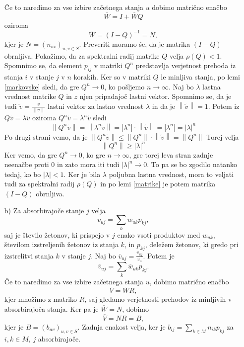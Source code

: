 \documentclass[twoside,11pt]{article}
\begin{document}
\begin{enumerate}
\noindent Če to naredimo za vse izbire začetnega stanja $u$ dobimo matrično enačbo
$$\overline{W} = I + \overline{W}Q$$
oziroma
$$\overline{W} = (I - Q)^{-1} = N,$$
kjer je $N=(n_{uv})_{u,v \in S}$. Preveriti moramo še, da je matrika $(I-Q)$ obrnljiva. Pokažimo, da za spektralni radij matrike $Q$ velja $\rho(Q) < 1$. Spomnimo se, da element $p_{ij}$ v matriki $Q^n$ predstavlja verjetnost prehoda iz stanja $i$ v stanje $j$ v $n$ korakih. Ker so v matriki $Q$ le minljiva stanja, po lemi \ref{markovske} sledi, da gre $Q^n \rightarrow 0$, ko pošljemo $n\rightarrow \infty$. Naj bo $\lambda$ lastna vrednost matrike $Q$ in $z$ njen pripadajoč lastni vektor. 
Spomnimo se, da je tudi $\widetilde{v} = \frac{v}{\left\lVert v\right\rVert }$ lastni vektor za lastno vrednost $\lambda$ in da je $\left\lVert \widetilde{v}\right\rVert = 1$. Potem iz $Q\widetilde{v} = \lambda\widetilde{v}$ oziroma $Q^n\widetilde{v} = \lambda^n\widetilde{v}$ sledi
\[
    \left\lVert Q^n\widetilde{v} \right\rVert = \left\lVert \lambda^n\widetilde{v}\right\rVert = \left\lvert \lambda^n\right\rvert\cdot \left\lVert \widetilde{v}\right\rVert = \left\lvert \lambda^n\right\rvert = \left\lvert \lambda\right\rvert^n 
\]
Po drugi strani vemo, da je $\left\lVert Q^n\widetilde{v} \right\rVert\leq \left\lVert Q^n \right\rVert \cdot \left\lVert \widetilde{v} \right\rVert = \left\lVert Q^n \right\rVert$
Torej velja
$$ \left\lVert Q^n \right\rVert \geq \left\lvert \lambda\right\rvert^n$$
Ker vemo, da gre $Q^n \rightarrow 0$, ko gre $n \rightarrow \infty$, gre torej leva stran zadnje neenačbe proti 0 in zato mora iti tudi $\left\lvert \lambda \right\rvert^n \rightarrow 0$. To pa se bo zgodilo natanko tedaj, ko bo $\left\lvert \lambda \right\rvert < 1$. Ker je bila $\lambda$ poljubna lastna vrednost, mora to veljati tudi za spektralni radij $\rho(Q)$ in po lemi \ref{matrike} je potem matrika $(I-Q)$ obrnljiva.

\item[b)] Za absorbirajoče stanje $j$ velja
$$v_{uj} = \sum_{k} w_{uk}p_{kj},$$
saj je število žetonov, ki prispejo v $j$ enako vsoti produktov med $w_{uk}$, številom izstreljenih žetonov iz stanja $k$, in $p_{kj}$, deležem žetonov, ki gredo pri izstrelitvi stanja $k$ v stanje $j$. \newline
Naj bo $\overline{v}_{uj} = \frac{v_{uj}}{v_{u}}$. Potem je
$$ \overline{v}_{uj} = \sum_{k} \overline{w}_{uk}p_{kj}.$$
Če to naredimo za vse izbire začetnega stanja $u$, dobimo matrično enačbo
$$\overline{V} = \overline{W}R,$$
kjer množimo z matriko $R$, saj gledamo verjetnosti prehodov iz minljivih v absorbirajoča stanja.
Ker pa je $\overline{W} = N$, dobimo 
$$\overline{V} = NR = B, $$
kjer je $B = (b_{uv})_{u,v \in S}$. Zadnja enakost velja, ker je $b_{ij} = \sum_{k\in M} n_{ik}p_{kj}$ za $i,k \in M$, $j$ absorbirajoče.

\hfill \QED
\end{enumerate}
\end{document}
